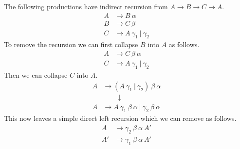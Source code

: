 The following productions have indirect recursion from $A \rightarrow B \rightarrow C \rightarrow A$.
\begin{align*}
    A &\rightarrow B\ \alpha\\
    B &\rightarrow C\ \beta\\
    C &\rightarrow A\ \gamma_1\ |\  \gamma_2
\end{align*}
To remove the recursion we can first collapse $B$ into $A$ as follows.
\begin{align*}
    A &\rightarrow C\ \beta\ \alpha\\
    C &\rightarrow A\ \gamma_1\ |\ \gamma_2
\end{align*}
Then we can collapse $C$ into $A$.
\begin{align*}
    A &\rightarrow (A\ \gamma_1\ |\  \gamma_2)\ \beta\ \alpha\\
    &\ \ \ \ \ \ \ \ \ \ \downarrow\\
    A &\rightarrow A\ \gamma_1\ \beta\ \alpha\ |\ \gamma_2\ \beta\ \alpha
\end{align*}
This now leaves a simple direct left recursion which we can remove as follows.
\begin{align*}
    A &\rightarrow \gamma_2\ \beta\ \alpha\ A'\\
    A' &\rightarrow \gamma_1\ \beta\ \alpha\ A'
\end{align*}